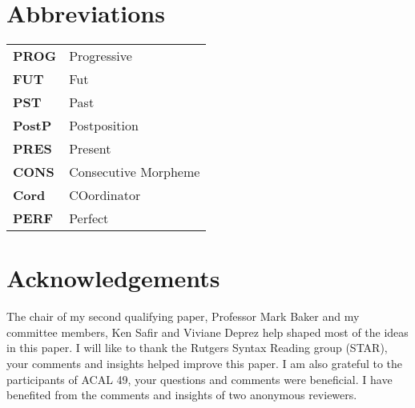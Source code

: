 \documentclass[output=paper,colorlinks,citecolor=brown]{langscibook}
\begin{document}
\section*{Abbreviations}


\begin{tabular}{l l} 
\textbf{PROG} & Progressive \\
\textbf{FUT} & Fut \\
\textbf{PST} & Past \\
\textbf{PostP} & Postposition  \\
\textbf{PRES} & Present  \\
\textbf{CONS} & Consecutive Morpheme  \\
\textbf{Cord} & COordinator \\

\textbf{PERF} & Perfect \\

\end{tabular}





\section*{Acknowledgements}
The chair of my second qualifying paper, Professor Mark Baker and my committee members, Ken Safir and Viviane Deprez help shaped most of the ideas in this paper. I will like to thank the Rutgers Syntax Reading group (STAR), your comments and insights helped improve this paper. I am also grateful to the participants of ACAL 49, your questions and comments were beneficial. I have benefited from the comments and insights of two anonymous reviewers.






\printbibliography[heading=subbibliography,notkeyword=this]
\end{document}
